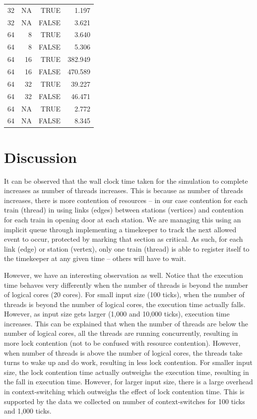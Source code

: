 \documentclass[a4paper,12pt]{article}
\begin{document}
\begin{center}
\begin{tabular}{r r r | r}
		32                      & NA         & TRUE  & 1.197   \\
		32                      & NA         & FALSE & 3.621   \\
		\hline
		64                      & 8          & TRUE  & 3.640   \\
		64                      & 8          & FALSE & 5.306   \\
		64                      & 16         & TRUE  & 382.949 \\
		64                      & 16         & FALSE & 470.589 \\
		64                      & 32         & TRUE  & 39.227  \\
		64                      & 32         & FALSE & 46.471  \\
		64                      & NA         & TRUE  & 2.772   \\
		64                      & NA         & FALSE & 8.345   \\
	\end{tabular}
\end{center}

\section{Discussion}
It can be observed that the wall clock time taken for the simulation to complete increases as number of threads increases. This is because as number of threads increases, there is more contention of resources -- in our case contention for each train (thread) in using links (edges) between stations (vertices) and contention for each train in opening door at each station. We are managing this using an implicit queue through implementing a timekeeper to track the next allowed event to occur, protected by marking that section as critical. As such, for each link (edge) or station (vertex), only one train (thread) is able to register itself to the timekeeper at any given time -- others will have to wait.

However, we have an interesting observation as well. Notice that the execution time behaves very differently when the number of threads is beyond the number of logical cores (20 cores). For small input size (100 ticks), when the number of threads is beyond the number of logical cores, the execution time actually falls. However, as input size gets larger (1,000 and 10,000 ticks), execution time increases. This can be explained that when the number of threads are below the number of logical cores, all the threads are running concurrently, resulting in more lock contention (not to be confused with resource contention). However, when number of threads is above the number of logical cores, the threads take turns to wake up and do work, resulting in less lock contention. For smaller input size, the lock contention time actually outweighs the execution time, resulting in the fall in execution time. However, for larger input size, there is a large overhead in context-switching which outweighs the effect of lock contention time. This is supported by the data we collected on number of context-switches for 100 ticks and 1,000 ticks.
\end{document}
